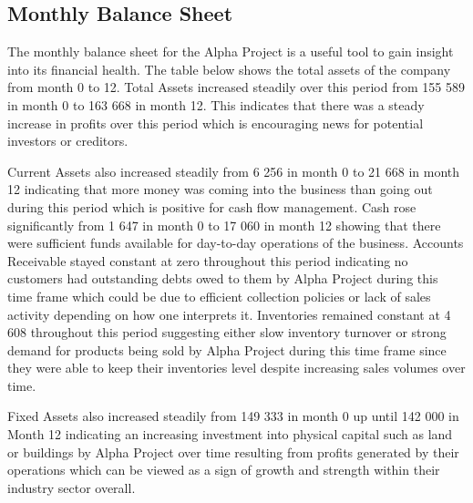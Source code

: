 

\subsection{Monthly Balance Sheet}\label{sec:title}

The monthly balance sheet for the Alpha Project is a useful tool to gain insight into its financial health. The table below shows the total assets of the company from month 0 to 12. Total Assets increased steadily over this period from 155 589 in month 0 to 163 668 in month 12. This indicates that there was a steady increase in profits over this period which is encouraging news for potential investors or creditors. 

Current Assets also increased steadily from 6 256 in month 0 to 21 668 in month 12 indicating that more money was coming into the business than going out during this period which is positive for cash flow management. Cash rose significantly from 1 647 in month 0 to 17 060 in month 12 showing that there were sufficient funds available for day-to-day operations of the business. Accounts Receivable stayed constant at zero throughout this period indicating no customers had outstanding debts owed to them by Alpha Project during this time frame which could be due to efficient collection policies or lack of sales activity depending on how one interprets it. Inventories remained constant at 4 608 throughout this period suggesting either slow inventory turnover or strong demand for products being sold by Alpha Project during this time frame since they were able to keep their inventories level despite increasing sales volumes over time. 

Fixed Assets also increased steadily from 149 333 in month 0 up until 142 000 in Month 12 indicating an increasing investment into physical capital such as land or buildings by Alpha Project over time resulting from profits generated by their operations which can be viewed as a sign of growth and strength within their industry sector overall. 

